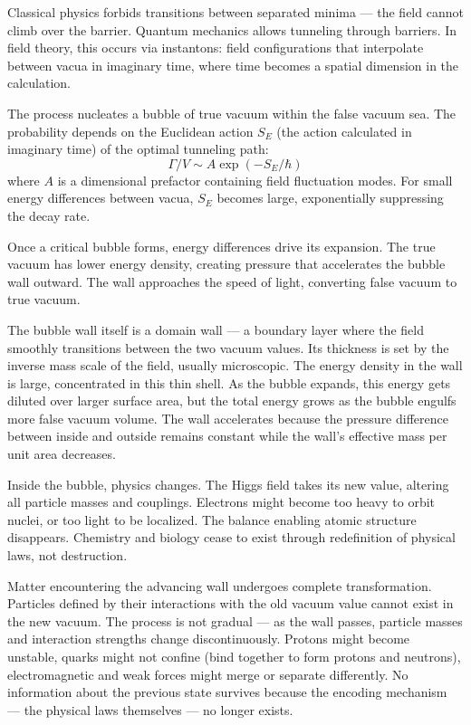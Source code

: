 Classical physics forbids transitions between separated minima — the field cannot climb over the barrier. Quantum mechanics allows tunneling through barriers. In field theory, this occurs via instantons: field configurations that interpolate between vacua in imaginary time, where time becomes a spatial dimension in the calculation.

The process nucleates a bubble of true vacuum within the false vacuum sea. The probability depends on the Euclidean action $S_E$ (the action calculated in imaginary time) of the optimal tunneling path:
\[
\Gamma/V \sim A \exp(-S_E/\hbar)
\]
where $A$ is a dimensional prefactor containing field fluctuation modes. For small energy differences between vacua, $S_E$ becomes large, exponentially suppressing the decay rate.

Once a critical bubble forms, energy differences drive its expansion. The true vacuum has lower energy density, creating pressure that accelerates the bubble wall outward. The wall approaches the speed of light, converting false vacuum to true vacuum.

The bubble wall itself is a domain wall — a boundary layer where the field smoothly transitions between the two vacuum values. Its thickness is set by the inverse mass scale of the field, usually microscopic. The energy density in the wall is large, concentrated in this thin shell. As the bubble expands, this energy gets diluted over larger surface area, but the total energy grows as the bubble engulfs more false vacuum volume. The wall accelerates because the pressure difference between inside and outside remains constant while the wall's effective mass per unit area decreases.

Inside the bubble, physics changes. The Higgs field takes its new value, altering all particle masses and couplings. Electrons might become too heavy to orbit nuclei, or too light to be localized. The balance enabling atomic structure disappears. Chemistry and biology cease to exist through redefinition of physical laws, not destruction.

Matter encountering the advancing wall undergoes complete transformation. Particles defined by their interactions with the old vacuum value cannot exist in the new vacuum. The process is not gradual — as the wall passes, particle masses and interaction strengths change discontinuously. Protons might become unstable, quarks might not confine (bind together to form protons and neutrons), electromagnetic and weak forces might merge or separate differently. No information about the previous state survives because the encoding mechanism — the physical laws themselves — no longer exists.


